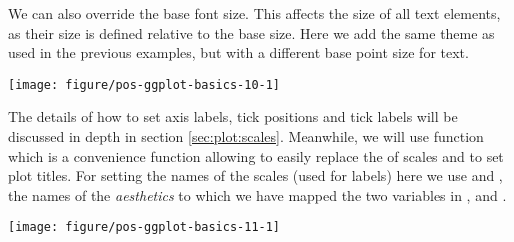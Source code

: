 \documentclass[krantz2]{krantz}\usepackage{knitr}%
\begin{document}
We can also override the base font size. This affects the size of all text elements, as their size is defined relative to the base size. Here we add the same theme as used in the previous examples, but with a different base point size for text.

\begin{knitrout}\footnotesize
{}\color{fgcolor}\begin{kframe}
\begin{alltt}
\hlstd{(} 
       \hlstd{(}    \hlopt{+}
  \hlstd{()} \hlopt{+}
  \hlstd{(}\hlstd{)}
\end{alltt}
\end{kframe}

{\centering \texttt{[image: figure/pos-ggplot-basics-10-1]} 

}



\end{knitrout}

The details of how to set axis labels, tick positions and tick labels will be discussed in depth in section \ref{sec:plot:scales}. Meanwhile, we will use function  which is a convenience function allowing to easily replace the  of scales and to set plot titles. For setting the names of the scales (used for labels) here we use  and , the names of the \emph{aesthetics} to which we have mapped the two variables in ,  and .

\begin{knitrout}\footnotesize
{}\color{fgcolor}\begin{kframe}
\begin{alltt}
\hlstd{(} 
       \hlstd{(}    \hlopt{+}
  \hlstd{()} \hlopt{+}
  \hlstd{(} \hlstd{=} \hlstd{,}
        \hlstd{=} \hlstd{,}
        \hlstd{=} \hlstd{,}
        \hlstd{=} \hlstd{)}
\end{alltt}
\end{kframe}

{\centering \texttt{[image: figure/pos-ggplot-basics-11-1]} 

}



\end{knitrout}
\end{document}
